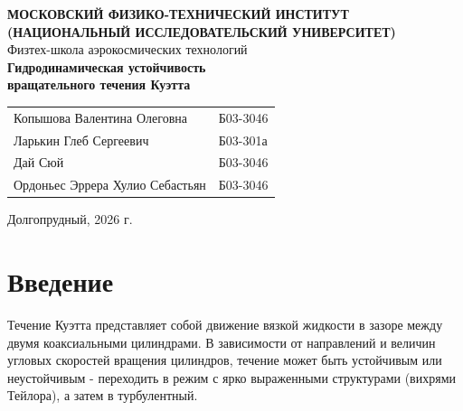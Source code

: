 \documentclass[a4paper,12pt]{article}
\begin{document}
\begin{titlepage}
    \begin{center}
        \textbf{МОСКОВСКИЙ ФИЗИКО-ТЕХНИЧЕСКИЙ ИНСТИТУТ} \\
        \textbf{(НАЦИОНАЛЬНЫЙ ИССЛЕДОВАТЕЛЬСКИЙ УНИВЕРСИТЕТ)}
        \\[1cm]

        
        {\large Физтех-школа аэрокосмических технологий}
        \\[3.5cm]

        {\Huge \textbf{Гидродинамическая устойчивость}}
        \\[0.5cm]
        {\Huge \textbf{вращательного течения Куэтта}}
        \\[10cm]

        \begin{flushright}
            \begin{tabular}{l l}
                Копышова Валентина Олеговна & Б03-3046 \\
                Ларькин Глеб Сергеевич & Б03-301а \\
                Дай Сюй                  & Б03-3046 \\
                Ордоньес Эррера Хулио Себастьян & Б03-3046 \\
            \end{tabular}
        \end{flushright}

        \vfill

        {\large Долгопрудный, 2026 г.}
    \end{center}
\end{titlepage}

\tableofcontents
\newpage

\section{Введение}
Течение Куэтта представляет собой движение вязкой жидкости в зазоре между двумя коаксиальными цилиндрами. В зависимости от направлений и величин угловых скоростей вращения цилиндров, течение может быть устойчивым или неустойчивым - переходить в режим с ярко выраженными структурами (вихрями Тейлора), а затем в турбулентный.
\end{document}
